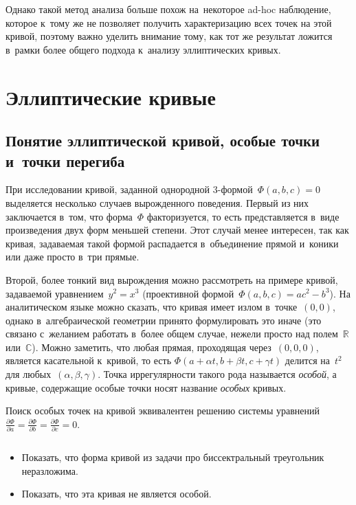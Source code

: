 \documentclass{article}
\begin{document}
Однако такой метод анализа больше похож на~некоторое ad-hoc наблюдение, которое
к~тому же не позволяет получить характеризацию всех точек на этой кривой,
поэтому важно уделить внимание тому, как тот же результат ложится в~рамки более
общего подхода к~анализу эллиптических кривых.

\section{Эллиптические кривые}
\subsection{Понятие эллиптической кривой, особые точки и~точки перегиба}

При исследовании кривой, заданной однородной 3-формой~$\Phi(a, b, c) = 0$
выделяется несколько случаев вырожденного поведения. Первый из них заключается
в~том, что форма~$\Phi$ факторизуется, то есть представляется в~виде
произведения двух форм меньшей степени. Этот случай менее интересен, так как
кривая, задаваемая такой формой распадается в~объединение прямой и~коники или
даже просто в~три прямые.

Второй, более тонкий вид вырождения можно рассмотреть на примере кривой,
задаваемой уравнением~$y^2 = x^3$ (проективной формой~$\Phi(a, b, c) = ac^2 -
b^3$). На аналитическом языке можно сказать, что кривая имеет излом
в~точке~$(0, 0)$, однако в~алгебраической геометрии принято формулировать это
иначе (это связано с~желанием работать в~более общем случае, нежели просто над
полем~$\mathbb{R}$ или~$\mathbb{C}$). Можно заметить, что любая прямая,
проходящая через~$(0, 0, 0)$, является касательной к~кривой, то есть $\Phi(a +
\alpha t, b + \beta t, c + \gamma t)$ делится на~$t^2$ для любых~$(\alpha,
\beta, \gamma)$. Точка иррегулярности такого рода называется \emph{особой}, а
кривые, содержащие особые точки носят название \emph{особых} кривых.
\begin{remark}
  Поиск особых точек на кривой эквивалентен решению системы
  уравнений~$\frac{\partial\Phi}{\partial a} = \frac{\partial\Phi}{\partial b} =
  \frac{\partial\Phi}{\partial c} = 0$.
\end{remark}
\begin{exercise}$ $
  \label{nonspec}
  \begin{itemize}
    \item Показать, что форма кривой из задачи про биссектральный треугольник
      неразложима.
    \item Показать, что эта кривая не является особой.
  \end{itemize}
\end{exercise}
\end{document}
